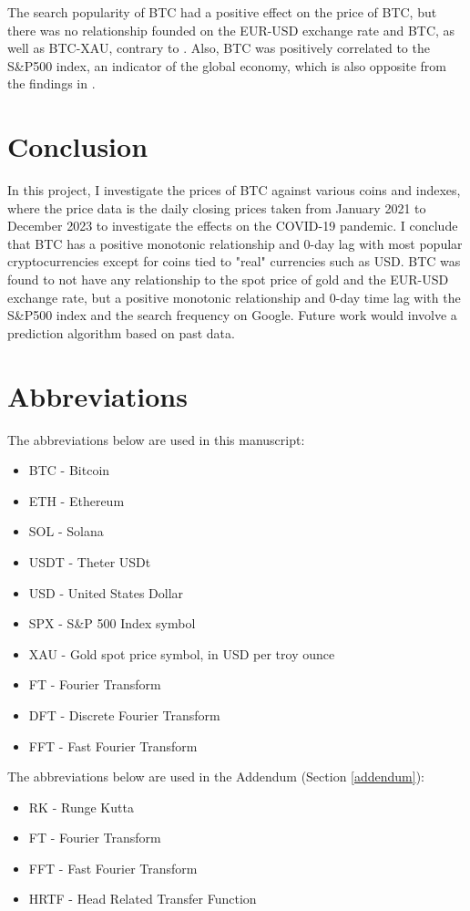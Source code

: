 \documentclass[a4paper, 10pt, conference]{ieeeconf}      %
\begin{document}
The search popularity of BTC had a positive effect on the price of BTC, but there was no relationship founded on the EUR-USD exchange rate and BTC, as well as BTC-XAU, contrary to \cite{Georgoula2015}. Also, BTC was positively correlated to the S\&P500 index, an indicator of the global economy, which is also opposite from the findings in \cite{Georgoula2015}.

\section{Conclusion}
In this project, I investigate the prices of BTC against various coins and indexes, where the price data is the daily closing prices taken from January 2021 to December 2023 to investigate the effects on the COVID-19 pandemic. I conclude that BTC has a positive monotonic relationship and 0-day lag with most popular cryptocurrencies except for coins tied to "real" currencies such as USD. BTC was found to not have any relationship to the spot price of gold and the EUR-USD exchange rate, but a positive monotonic relationship and 0-day time lag with the S\&P500 index and the search frequency on Google. Future work would involve a prediction algorithm based on past data.

\section{Abbreviations}
The abbreviations below are used in this manuscript:
\begin{itemize}
    \item BTC - Bitcoin
    \item ETH - Ethereum
    \item SOL - Solana
    \item USDT - Theter USDt
    \item USD - United States Dollar
    \item SPX - S\&P 500 Index symbol
    \item XAU - Gold spot price symbol, in USD per troy ounce
    \item FT - Fourier Transform
    \item DFT - Discrete Fourier Transform
    \item FFT - Fast Fourier Transform
\end{itemize}

The abbreviations below are used in the Addendum (Section \ref{addendum}):
\begin{itemize}
    \item RK - Runge Kutta
    \item FT - Fourier Transform
    \item FFT - Fast Fourier Transform
    \item HRTF - Head Related Transfer Function
\end{itemize}
\end{document}
